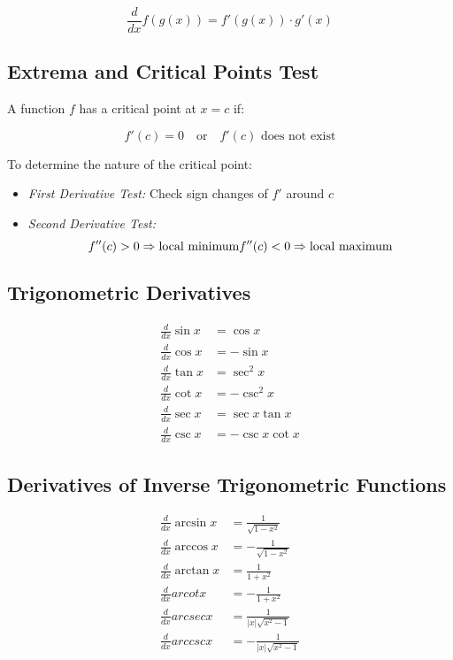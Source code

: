 \[
    \frac{d}{dx} f(g(x)) = f'(g(x)) \cdot g'(x)
\]

\subsection{Extrema and Critical Points Test}

A function \(f\) has a critical point at \(x = c\) if:

\[
    f'(c) = 0 \quad \text{or} \quad f'(c) \text{ does not exist}
\]

To determine the nature of the critical point:

\begin{itemize}

    \item \emph{First Derivative Test:} Check sign changes of \(f'\) around \(c\)

    \item \emph{Second Derivative Test:}
    \[
        f''(c) > 0 \Rightarrow \text{local minimum} \\
        f''(c) < 0 \Rightarrow \text{local maximum}
    \]
\end{itemize}

\subsection{Trigonometric Derivatives}

\begin{align*}
    \frac{d}{dx} \sin x &= \cos x \\
    \frac{d}{dx} \cos x &= -\sin x \\
    \frac{d}{dx} \tan x &= \sec^2 x \\
    \frac{d}{dx} \cot x &= -\csc^2 x \\
    \frac{d}{dx} \sec x &= \sec x \tan x \\
    \frac{d}{dx} \csc x &= -\csc x \cot x
\end{align*}

\subsection{Derivatives of Inverse Trigonometric Functions}

\begin{align*}
    \frac{d}{dx} \arcsin x &= \frac{1}{\sqrt{1 - x^2}} \\
    \frac{d}{dx} \arccos x &= -\frac{1}{\sqrt{1 - x^2}} \\
    \frac{d}{dx} \arctan x &= \frac{1}{1 + x^2} \\
    \frac{d}{dx} arcot x &= -\frac{1}{1 + x^2} \\
    \frac{d}{dx} arcsec x &= \frac{1}{|x|\sqrt{x^2 - 1}} \\
    \frac{d}{dx} arccsc x &= -\frac{1}{|x|\sqrt{x^2 - 1}}
\end{align*}

